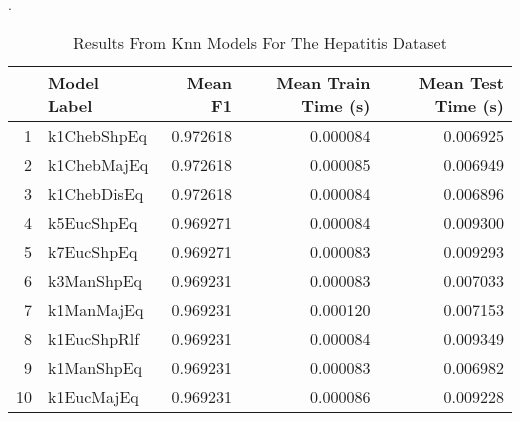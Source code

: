 .\begin{table}
\centering
\caption{Results From Knn Models For The Hepatitis Dataset}
\label{tab:knn_results_hepatitis}
\begin{tabular}{rlrrr}
\toprule
 & Model Label & Mean F1 & Mean Train Time (s) & Mean Test Time (s) \\
\midrule
1 & k1ChebShpEq & 0.972618 & 0.000084 & 0.006925 \\
2 & k1ChebMajEq & 0.972618 & 0.000085 & 0.006949 \\
3 & k1ChebDisEq & 0.972618 & 0.000084 & 0.006896 \\
4 & k5EucShpEq & 0.969271 & 0.000084 & 0.009300 \\
5 & k7EucShpEq & 0.969271 & 0.000083 & 0.009293 \\
6 & k3ManShpEq & 0.969231 & 0.000083 & 0.007033 \\
7 & k1ManMajEq & 0.969231 & 0.000120 & 0.007153 \\
8 & k1EucShpRlf & 0.969231 & 0.000084 & 0.009349 \\
9 & k1ManShpEq & 0.969231 & 0.000083 & 0.006982 \\
10 & k1EucMajEq & 0.969231 & 0.000086 & 0.009228 \\
\bottomrule
\end{tabular}
\end{table}
